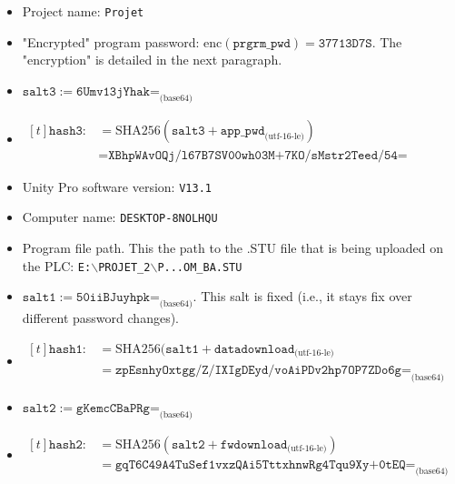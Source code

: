 \begin{itemize}
    \item Project name: \texttt{Projet}

    \item "Encrypted" program password: $\textrm{enc}(\texttt{prgrm\_pwd}) = \texttt{37713D7S}$. The "encryption" is detailed in the next paragraph.
    
    \item $\texttt{salt3} := \texttt{6Umv13jYhak=}_{\textrm{(base64)}}$
    
    \item $\begin{aligned}[t]
        \texttt{hash3} :&= \textrm{SHA256}(\texttt{salt3}+\texttt{app\_pwd}_{\textrm{(utf-16-le)}}) \\ &= \texttt{XBhpWAvOQj/l67B7SV00wh03M+7KO/sMstr2Teed/54=}
    \end{aligned}$
    
    \item Unity Pro software version: \texttt{V13.1}
    
    \item Computer name: \texttt{DESKTOP-8NOLHQU}
    
    \item Program file path. This the path to the .STU file that is being uploaded on the PLC: \texttt{E:$\backslash$PROJET\_2$\backslash$P...OM\_BA.STU}
    
    \item $\texttt{salt1} := \texttt{50iiBJuyhpk=}_{\textrm{(base64)}}$. This salt is fixed (i.e., it stays fix over different password changes).
    \item $\begin{aligned}[t]\texttt{hash1} :&= \textrm{SHA256}(\texttt{salt1} + \texttt{datadownload}_{\textrm{(utf-16-le)}} \\ &= \texttt{zpEsnhyOxtgg/Z/IXIgDEyd/voAiPDv2hp7OP7ZDo6g=}_{\textrm{(base64)}}\end{aligned}$
    \item $\texttt{salt2} := \texttt{gKemcCBaPRg=}_{\textrm{(base64)}}$
    \item $\begin{aligned}[t]\texttt{hash2} :&= \textrm{SHA256}(\texttt{salt2} + \texttt{fwdownload}_{\textrm{(utf-16-le)}}) \\ &= \texttt{gqT6C49A4TuSef1vxzQAi5TttxhnwRg4Tqu9Xy+0tEQ=}_{\textrm{(base64)}}\end{aligned}$
\end{itemize}

